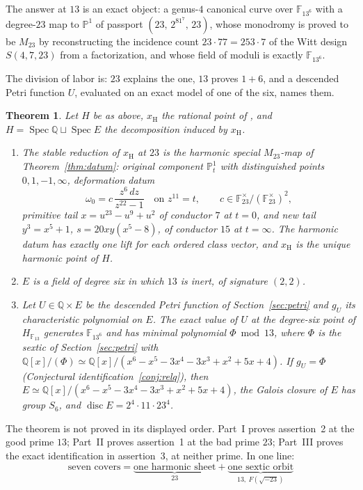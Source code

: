 \documentclass[11pt]{amsart}
\newif\ifrelqclosed
\newcommand{\QQ}{\mathbb{Q}}
\newcommand{\FF}{\mathbb{F}}
\newcommand{\PP}{\mathbb{P}}
\newcommand{\Mtw}{M_{23}}
\newcommand{\sqm}{\sqrt{-23}}
\newcommand{\Spec}{\operatorname{Spec}}
\newcommand{\disc}{\operatorname{disc}}
\newcommand{\xH}{x_{\mathrm H}}
\newcommand{\gU}{g_U}
\newcommand{\sextic}{x^6-x^5-3x^4-3x^3+x^2+5x+4}
\theoremstyle{plain}
\newtheorem{theorem}{Theorem}[section]
\theoremstyle{definition}
\begin{document}
The answer at $13$ is an exact object: a genus-$4$ canonical curve
over $\FF_{13^6}$ with a degree-$23$ map to $\PP^1$ of passport
$(23,\,2^81^7,\,23)$, whose monodromy is proved to be $\Mtw$ by
reconstructing the incidence count $23\cdot77=253\cdot7$ of the Witt
design $S(4,7,23)$ from a factorization, and whose field of moduli is
exactly $\FF_{13^6}$.

The division of labor is: $23$ explains the one, $13$ proves $1+6$,
and a descended Petri function $U$, evaluated on an exact model of one
of the six, names them.

\begin{theorem}\label{thm:main}
Let $H$ be as above, $\xH$ the rational point of \cite{HJLPPZ}, and
$H=\Spec\QQ\sqcup\Spec E$ the decomposition induced by $\xH$.
\begin{enumerate}
\item The stable reduction of $\xH$ at $23$ is the harmonic special
$\Mtw$-map of Theorem~\ref{thm:datum}: original component
$\PP^1_t$ with distinguished points $0,1,-1,\infty$, deformation datum
\[
  \omega_0=c\,\frac{z^6\,dz}{z^{22}-1}\quad\text{on }z^{11}=t,\qquad
  c\in\FF_{23}^\times/(\FF_{23}^\times)^2,
\]
primitive tail $x=u^{23}-u^9+u^2$ of conductor $7$ at $t=0$, and new
tail $y^3=x^5+1$, $s=20xy(x^5-8)$, of conductor $15$ at $t=\infty$.
The harmonic datum has exactly one lift for each ordered class vector,
and $\xH$ is the unique harmonic point of $H$.
\item $E$ is a field of degree six in which $13$ is inert, of
signature $(2,2)$.
\ifrelqclosed
\item $E\simeq\QQ[x]/(\sextic)$; the Galois closure of $E$ has group
$S_6$ and $\disc E=2^4\cdot11\cdot23^4$.
\else
\item Let $U\in\QQ\times E$ be the descended Petri function of
Section~\ref{sec:petri} and $\gU$ its characteristic polynomial on
$E$. The exact value of $U$ at the degree-six point of $H_{\FF_{13}}$
generates $\FF_{13^6}$ and has minimal polynomial $\Phi\bmod13$, where
$\Phi$ is the sextic of Section~\ref{sec:petri} with
$\QQ[x]/(\Phi)\simeq\QQ[x]/(\sextic)$. If $\gU=\Phi$
(Conjectural identification~\ref{conj:relq}), then
$E\simeq\QQ[x]/(\sextic)$, the Galois closure of $E$ has group $S_6$,
and $\disc E=2^4\cdot11\cdot23^4$.
\fi
\end{enumerate}
\end{theorem}

The theorem is not proved in its displayed order. Part~I proves
assertion~2 at the good prime $13$; Part~II proves assertion~1 at the
bad prime $23$; Part~III proves the exact identification in
assertion~3, at neither prime. In one line:
\[
\boxed{\ \text{seven covers}
 =\underbrace{\text{one harmonic sheet}}_{23}
 +\underbrace{\text{one sextic orbit}}_{13,\ F(\sqm)}\ }
\]
\end{document}
